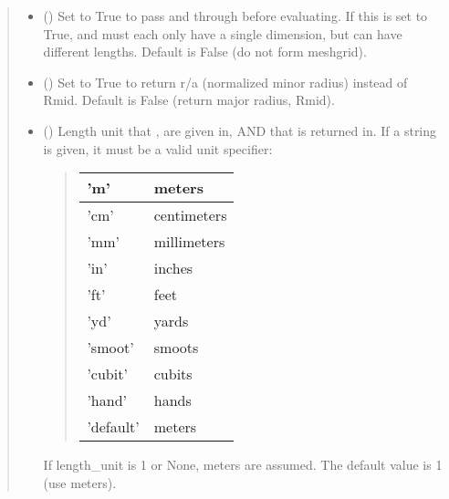\documentclass[letterpaper,10pt,english]{sphinxmanual}
\begin{document}
\begin{fulllineitems}
\begin{fulllineitems}
\begin{quote}
\begin{description}
\begin{itemize}
\item {} 
 () \textendash{} Set to True to pass  and  through
 before evaluating. If this is set to
True,  and  must each only have a single dimension, but
can have different lengths. Default is False (do not form
meshgrid).

\item {} 
 () \textendash{} Set to True to return r/a (normalized minor radius)
instead of Rmid. Default is False (return major radius, Rmid).

\item {} 
 () \textendash{} 
Length unit that ,  are given in,
AND that  is returned in. If a string is given, it must
be a valid unit specifier:
\begin{quote}


\begin{savenotes}\sphinxattablestart
\centering
\begin{tabulary}{\linewidth}[t]{|T|T|}
\hline

’m’
&
meters
\\
\hline
’cm’
&
centimeters
\\
\hline
’mm’
&
millimeters
\\
\hline
’in’
&
inches
\\
\hline
’ft’
&
feet
\\
\hline
’yd’
&
yards
\\
\hline
’smoot’
&
smoots
\\
\hline
’cubit’
&
cubits
\\
\hline
’hand’
&
hands
\\
\hline
’default’
&
meters
\\
\hline
\end{tabulary}
\par
\sphinxattableend\end{savenotes}
\end{quote}

If length\_unit is 1 or None, meters are assumed. The default
value is 1 (use meters).



\end{itemize}
\end{description}
\end{quote}
\end{fulllineitems}
\end{fulllineitems}
\end{document}
